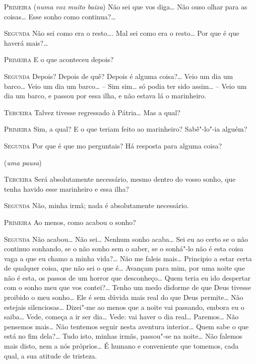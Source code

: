 \textsc{Primeira} (\textit{numa voz muito baixa}) Não sei que vos
diga\ldots{} Não ouso olhar para as coisas\ldots{} 
Esse sonho como continua?\ldots{} 

\textsc{Segunda} Não sei como era o resto\ldots{}.
Mal sei como era o resto\ldots{} Por que é que haverá mais?\ldots{}

\textsc{Primeira} E o que aconteceu depois?

\textsc{Segunda} Depois? Depois de quê? Depois é
alguma coisa?\ldots{} Veio um dia
um barco\ldots{} Veio um dia um barco\ldots{} 
-- Sim sim\ldots{} só podia ter sido
assim\ldots{} -- Veio um dia um barco,
e passou por essa ilha, e não estava
lá o marinheiro.

\textsc{Terceira} Talvez tivesse regressado à Pátria\ldots{} 
Mas a qual?

\textsc{Primeira} Sim, a qual? E o que teriam feito ao marinheiro?
Sabê"-lo"-ia alguém?

\textsc{Segunda} Por que é que mo perguntais?
Há resposta para alguma coisa?

\hfill(\textit{uma pausa}) 				%

\textsc{Terceira} Será absolutamente necessário,
mesmo dentro do vosso sonho,
que tenha havido esse marinheiro e essa ilha?

\textsc{Segunda} Não, minha irmã; nada é absolutamente necessário.

\textsc{Primeira} Ao menos, como acabou o sonho?

\textsc{Segunda} Não acabou\ldots{} Não sei\ldots{} 
Nenhum sonho acaba\ldots{} Sei eu ao certo
se o não continuo sonhando, se o não sonho 
sem o saber, se o sonhá"-lo
não é esta coisa vaga a que eu chamo a minha vida?\ldots{}
Não me faleis mais\ldots{} Principio a estar certa de 
qualquer coisa, que não sei o que
é\ldots{} Avançam para mim, por uma noite que
não é esta, os passos de um
horror que desconheço\ldots{} Quem teria eu
ido despertar com o sonho meu
que vos contei?\ldots{} Tenho um medo 
disforme de que Deus tivesse proibido
o meu sonho\ldots{} Ele é sem dúvida mais
real do que Deus permite\ldots{} Não
estejais silenciosas\ldots{} Dizei"-me ao
menos que a noite vai passando,
embora eu o saiba\ldots{} Vede, começa a ir ser dia\ldots{}
Vede: vai haver o dia real\ldots{} Paremos\ldots{} 
Não pensemos mais\ldots{} Não tentemos seguir nesta
aventura interior\ldots{} Quem sabe o que está
no fim dela?\ldots{} Tudo isto,
minhas irmãs, passou"-se na noite\ldots{}
Não falemos mais disto, nem a nós
próprios\ldots{} É humano e conveniente que 
tomemos, cada qual, a sua atitude de tristeza.

